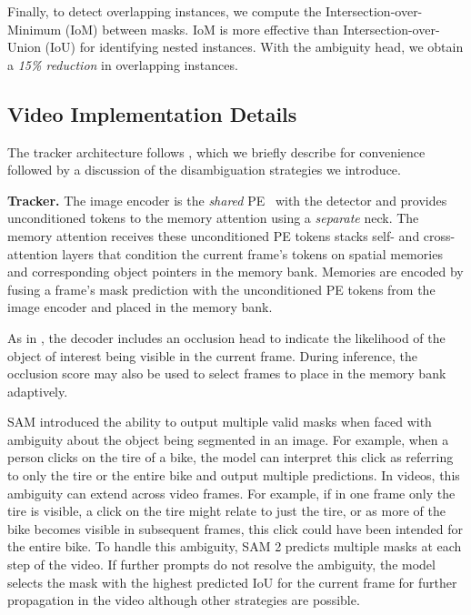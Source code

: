 \documentclass[]{fairmeta}
\renewcommand{\paragraph}[1]{%
	\noindent\textbf{#1.}\noindent\xspace%
}
\begin{document}
Finally, to detect overlapping instances, we compute the Intersection-over-Minimum (IoM) between masks. IoM is more effective than Intersection-over-Union (IoU) for identifying nested instances. With the ambiguity head, we obtain a \textit{15\% reduction} in overlapping instances.


\subsection{Video Implementation Details}
\label{sec:dense_tracking_heuristics}

The tracker architecture follows \cite{sam2}, which we briefly describe for convenience followed by a discussion of the disambiguation strategies we introduce.

\paragraph{Tracker} The image encoder is the \textit{shared} PE~\citep{bolya2025PerceptionEncoder} with the detector and provides unconditioned tokens to the memory attention using a \textit{separate} neck. The memory attention receives these unconditioned PE tokens stacks self- and cross- attention layers that condition the current frame's tokens on spatial memories and corresponding object pointers in the memory bank. Memories are encoded by fusing a frame's mask prediction with the unconditioned PE tokens from the image encoder and placed in the memory bank.

As in \cite{sam2}, the decoder includes an occlusion head to indicate the likelihood of the object of interest being visible in the current frame. During inference, the occlusion score may also be used to select frames to place in the memory bank adaptively.

SAM introduced the ability to output multiple valid masks when faced with ambiguity about the object being segmented in an image. For example, when a person clicks on the tire of a bike, the model can interpret this click as referring to only the tire or the entire bike and output multiple predictions. In videos, this ambiguity can extend across video frames. For example, if in one frame only the tire is visible, a click on the tire might relate to just the tire, or as more of the bike becomes visible in subsequent frames, this click could have been intended for the entire bike. To handle this ambiguity, SAM 2 predicts multiple masks at each step of the video. If further prompts do not resolve the ambiguity, the model selects the mask with the highest predicted IoU for the current frame for further propagation in the video although other strategies are possible.
\end{document}
